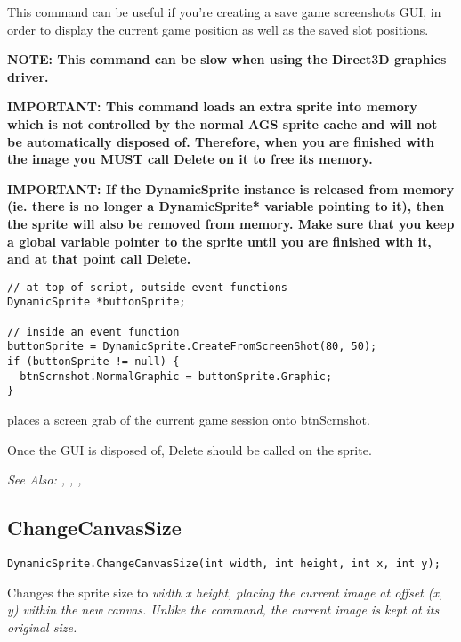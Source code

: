 This command can be useful if you're creating a save game screenshots GUI, in order to
display the current game position as well as the saved slot positions.

\bf{NOTE:} This command can be slow when using the Direct3D graphics driver.

\bf{IMPORTANT:} This command loads an extra sprite into memory which is not controlled
by the normal AGS sprite cache and will not be automatically disposed of. Therefore, when
you are finished with the image you \bf{MUST} call Delete on it to free its memory.

\bf{IMPORTANT:} If the DynamicSprite instance is released from memory (ie. there is
no longer a DynamicSprite* variable pointing to it), then the sprite will also be
removed from memory. Make sure that you keep a global variable pointer to the sprite
until you are finished with it, and at that point call Delete.

\begin{verbatim}
// at top of script, outside event functions
DynamicSprite *buttonSprite;

// inside an event function
buttonSprite = DynamicSprite.CreateFromScreenShot(80, 50);
if (buttonSprite != null) {
  btnScrnshot.NormalGraphic = buttonSprite.Graphic;
}
\end{verbatim}
places a screen grab of the current game session onto btnScrnshot.

Once the GUI is disposed of, Delete should be called on the sprite.

\it{See Also:} ,
,
,


\subsection{ChangeCanvasSize}\label{DynamicSprite.ChangeCanvasSize}%

\begin{verbatim}
DynamicSprite.ChangeCanvasSize(int width, int height, int x, int y);
\end{verbatim}
Changes the sprite size to \it{width} x \it{height}, placing the current image
at offset (x, y) within the new canvas. Unlike the 
command, the current image is kept at its original size.

